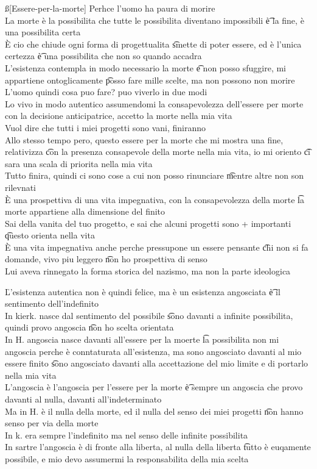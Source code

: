 \documentclass[12pt]{article}
\begin{document}
\ss[Essere-per-la-morte]
Perhce l'uomo ha paura di morire \\
La morte è la possibilita che tutte le possibilita diventano impossibili \t è la fine, è una possibilita certa \\
È cio che chiude ogni forma di progettualita \t smette di poter essere, ed è l'unica certezza \t è una possibilita che non so quando accadra \\
L'esistenza contempla in modo necessario la morte \t e non posso sfuggire, mi appartiene ontoglicamente \t posso fare mille scelte, ma non possono non morire \\
L'uomo quindi cosa puo fare? puo viverlo in due modi \\
Lo vivo in modo autentico assumendomi la consapevolezza dell'essere per morte con la decisione anticipatrice, accetto la morte nella mia vita \\
Vuol dire che tutti i miei progetti sono vani, finiranno \\
Allo stesso tempo pero, questo essere per la morte che mi mostra una fine, relativizza \t con la presenza consapevole della morte nella mia vita, io mi oriento \t ci sara una scala di priorita nella mia vita \\
Tutto finira, quindi ci sono cose a cui non posso rinunciare \t mentre altre non son rilevnati \\
È una prospettiva di una vita impegnativa, con la consapevolezza della morte \t la morte appartiene alla dimensione del finito \\
Sai della vanita del tuo progetto, e sai che alcuni progetti sono + importanti \t questo orienta nella vita \\
È una vita impegnativa anche perche pressupone un essere pensante \t chi non si fa domande, vivo piu leggero \t non ho prospettiva di senso \\
Lui aveva rinnegato la forma storica del nazismo, ma non la parte ideologica

\v

L'esistenza autentica non è quindi felice, ma è un esistenza angosciata \t è il sentimento dell'indefinito \\
In kierk. nasce dal sentimento del possibile \t sono davanti a infinite possibilita, quindi provo angoscia \t non ho scelta orientata \\
In H. angoscia nasce davanti all'essere per la moerte \t la possibilita non mi angoscia perche è conntaturata all'esistenza, ma sono angosciato davanti al mio essere finito \t sono angosciato davanti alla accettazione del mio limite e di portarlo nella mia vita \\
L'angoscia è l'angoscia per l'essere per la morte \t è sempre un angoscia che provo davanti al nulla, davanti all'indeterminato \\
Ma in H. è il nulla della morte, ed il nulla del senso dei miei progetti \t non hanno senso per via della morte \\
In k. era sempre l'indefinito ma nel senso delle infinite possibilita \\
In sartre l'angoscia è di fronte alla liberta, al nulla della liberta \t tutto è euqamente possibile, e mio devo assumermi la responsabilita della mia scelta 
\end{document}
